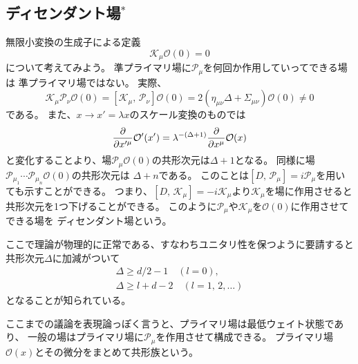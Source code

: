 \documentclass[../../master.tex]{subfiles}
\begin{document}
\subsection*{ディセンダント場\(^*\)}
無限小変換の生成子による定義
\setcounter{equation}{58}
\begin{equation}
    \mathscr{K}_\mu\mathcal{O}(0) = 0
\end{equation}
について考えてみよう。
準プライマリ場に\(\mathscr{P}_\mu\)を何回か作用していってできる場は
準プライマリ場ではない。
実際、
\begin{equation}
    \mathscr{K}_\mu \mathscr{P}_\nu \mathcal{O}(0) = [\mathscr{K}_\mu,\, \mathscr{P}_\nu] \mathcal{O}(0) = 2(\eta_{\mu\nu} \Delta + \Sigma_{\mu\nu})\mathcal{O}(0) \neq 0
\end{equation}
である。
また、\(x\rightarrow x' = \lambda x\)のスケール変換のものでは
\begin{equation}
    \pdv{x'^\mu} \mathcal{O}'(x') = \lambda^{-(\Delta+1)}\pdv{x^\mu} \mathcal{O}(x)
\end{equation}
と変化することより、場\(\mathscr{P}_\mu\mathcal{O}(0)\)の共形次元は\(\Delta+1\)となる。
同様に場\(\mathscr{P}_{\mu_1}\cdots\mathscr{P}_{\mu_n}\mathcal{O}(0)\)の共形次元は
\(\Delta+n\)である。
このことは\([D,\,\mathscr{P}_\mu]=i\mathscr{P}_\mu\)を用いても示すことができる。
つまり、\([D,\,\mathscr{K}_\mu]=-i\mathscr{K}_\mu\)より\(\mathscr{K}_\mu\)を場に作用させると
共形次元を1つ下げることができる。
このように\(\mathscr{P}_\mu\)や\(\mathscr{K}_\mu\)を\(\mathcal{O}(0)\)に作用させてできる場を
ディセンダント場という。

ここで理論が物理的に正常である、すなわちユニタリ性を保つように要請すると
共形次元\(\Delta\)に加減がついて
\begin{align}
    \Delta\geq d/2-1 \quad(l=0),\\
    \Delta\geq l+d-2 \quad(l=1,\,2,\dots)
\end{align}
となることが知られている。

ここまでの議論を表現論っぽく言うと、プライマリ場は最低ウェイト状態であり、
一般の場はプライマリ場に\(\mathscr{P}_\mu\)を作用させて構成できる。
プライマリ場\(\mathcal{O}(x)\)とその微分をまとめて共形族という。
\end{document}
